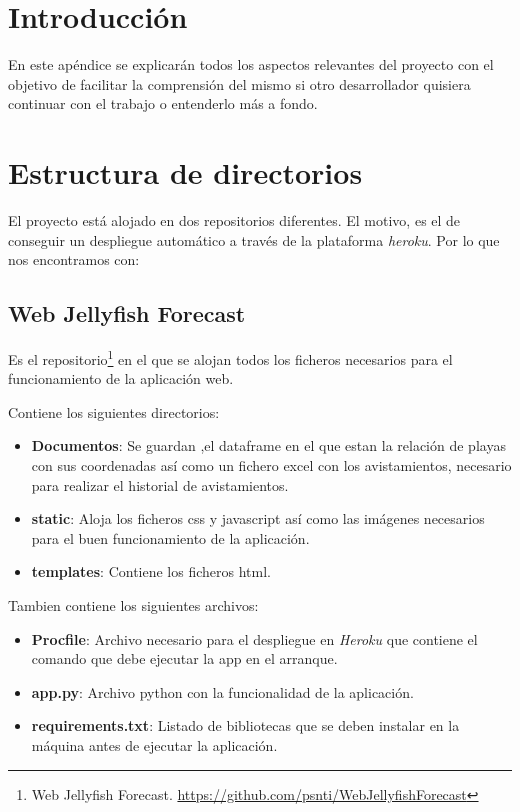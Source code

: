 
\section{Introducción}
En este apéndice se explicarán todos los aspectos relevantes del proyecto con el objetivo de facilitar la comprensión del mismo si otro desarrollador quisiera continuar con el trabajo o entenderlo más a fondo.

\section{Estructura de directorios}

El proyecto está alojado en dos repositorios diferentes. El motivo, es el de conseguir un despliegue automático a través de la plataforma \emph{heroku}. Por lo que nos encontramos con:

\subsection{Web Jellyfish Forecast}
Es el repositorio\footnote{Web Jellyfish Forecast. \url{https://github.com/psnti/WebJellyfishForecast}} en el que se alojan todos los ficheros necesarios para el funcionamiento de la aplicación web.

Contiene los siguientes directorios:
\begin{itemize}
	\item \textbf{Documentos}: Se guardan ,el dataframe en el que estan la relación de playas con sus coordenadas así como un fichero excel con los avistamientos, necesario para realizar el historial de avistamientos.
	\item \textbf{static}: Aloja los ficheros css y javascript así como las imágenes necesarios para el buen funcionamiento de la aplicación.
	\item \textbf{templates}: Contiene los ficheros html.
\end{itemize}

Tambien contiene los siguientes archivos:
\begin{itemize}
	\item \textbf{Procfile}: Archivo necesario para el despliegue en \emph{Heroku} que contiene el comando que debe ejecutar la app en el arranque.
	\item \textbf{app.py}: Archivo python con la funcionalidad de la aplicación.
	\item \textbf{requirements.txt}: Listado de bibliotecas que se deben instalar en la máquina antes de ejecutar la aplicación.
\end{itemize}

